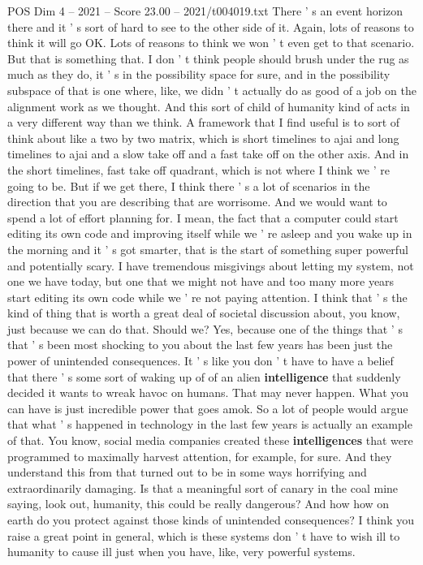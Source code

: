 \begin{textsample}{POS Dim 4 – 2021 – Score 23.00 – 2021/t004019.txt}
There ' s an event horizon there and it ' s sort of hard to see to the other side of it.
Again, lots of reasons to think it will go OK.
Lots of reasons to think we won ' t even get to that scenario.
But that is something that.
I don ' t think people should brush under the rug as much as they do, it ' s in the possibility space for sure, and in the possibility subspace of that is one where, like, we didn ' t actually do as good of a job on the alignment work as we thought.
And this sort of child of humanity kind of acts in a very different way than we think.
A framework that I find useful is to sort of think about like a two by two matrix, which is short timelines to ajai and long timelines to ajai and a slow take off and a fast take off on the other axis.
And in the short timelines, fast take off quadrant, which is not where I think we ' re going to be.
But if we get there, I think there ' s a lot of scenarios in the direction that you are describing that are worrisome.
And we would want to spend a lot of effort planning for.
I mean, the fact that a computer could start editing its own code and improving itself while we ' re asleep and you wake up in the morning and it ' s got smarter, that is the start of something super powerful and potentially scary.
I have tremendous misgivings about letting my system, not one we have today, but one that we might not have and too many more years start editing its own code while we ' re not paying attention.
I think that ' s the kind of thing that is worth a great deal of societal discussion about, you know, just because we can do that.
Should we?
Yes, because one of the things that ' s that ' s been most shocking to you about the last few years has been just the power of unintended consequences.
It ' s like you don ' t have to have a belief that there ' s some sort of waking up of of an alien \textbf{intelligence} that suddenly decided it wants to wreak havoc on humans.
That may never happen.
What you can have is just incredible power that goes amok.
So a lot of people would argue that what ' s happened in technology in the last few years is actually an example of that.
You know, social media companies created these \textbf{intelligences} that were programmed to maximally harvest attention, for example, for sure.
And they understand this from that turned out to be in some ways horrifying and extraordinarily damaging.
Is that a meaningful sort of canary in the coal mine saying, look out, humanity, this could be really dangerous?
And how how on earth do you protect against those kinds of unintended consequences?
I think you raise a great point in general, which is these systems don ' t have to wish ill to humanity to cause ill just when you have, like, very powerful systems.

\end{textsample}
